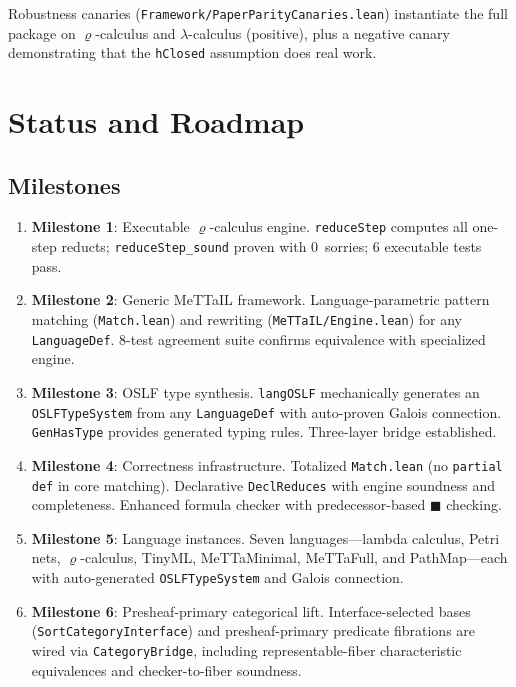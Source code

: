 \documentclass[]{article}
\newcommand{\code}[1]{\texttt{#1}}
\newcommand{\rhocalc}{\ensuremath{\varrho}}
\newcommand{\Bx}{\ensuremath{\blacksquare}}
\newcommand{\OSLF}{\textup{OSLF}}
\newcommand{\MeTTaIL}{\textup{MeTTaIL}}
\begin{document}
Robustness canaries (\code{Framework/PaperParityCanaries.lean}) instantiate the
full package on $\varrho$-calculus and $\lambda$-calculus (positive), plus a
negative canary demonstrating that the \code{hClosed} assumption does real work.

\section{Status and Roadmap}

\subsection{Milestones}

\begin{enumerate}
\item[\checkmark] \textbf{Milestone 1}: Executable \rhocalc{}-calculus engine.
  \code{reduceStep} computes all one-step reducts; \code{reduceStep\_sound} proven
  with 0~sorries; 6 executable tests pass.

\item[\checkmark] \textbf{Milestone 2}: Generic \MeTTaIL{} framework.
  Language-parametric pattern matching (\code{Match.lean}) and rewriting
  (\code{MeTTaIL/Engine.lean}) for any \code{LanguageDef}.
  8-test agreement suite confirms equivalence with specialized engine.

\item[\checkmark] \textbf{Milestone 3}: \OSLF{} type synthesis.
  \code{langOSLF} mechanically generates an \code{OSLFTypeSystem} from any
  \code{LanguageDef} with auto-proven Galois connection.  \code{GenHasType}
  provides generated typing rules.  Three-layer bridge established.

\item[\checkmark] \textbf{Milestone 4}: Correctness infrastructure.
  Totalized \code{Match.lean} (no \code{partial def} in core matching).
  Declarative \code{DeclReduces} with engine soundness and completeness.
  Enhanced formula checker with predecessor-based $\Bx$ checking.

\item[\checkmark] \textbf{Milestone 5}: Language instances.
  Seven languages---lambda calculus, Petri nets, \rhocalc{}-calculus, TinyML,
  MeTTaMinimal, MeTTaFull, and PathMap---each with auto-generated \code{OSLFTypeSystem}
  and Galois connection.

\item[\checkmark] \textbf{Milestone 6}: Presheaf-primary categorical lift.
  Interface-selected bases (\code{SortCategoryInterface}) and presheaf-primary
  predicate fibrations are wired via \code{CategoryBridge}, including
  representable-fiber characteristic equivalences and checker-to-fiber soundness.


\end{enumerate}
\end{document}
